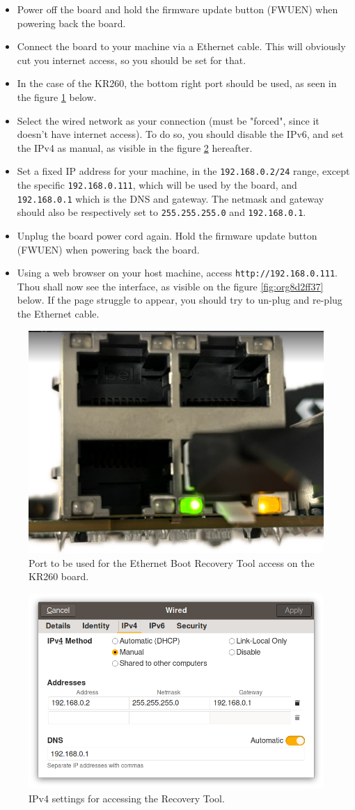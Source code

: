 \documentclass[10pt]{article}
\begin{document}
\begin{itemize}
\item Power off the board and hold the firmware update button (FWUEN) when powering back the board.
\item Connect the board to your machine via a Ethernet cable.
This will obviously cut you internet access, so you should be set for that.
\item In the case of the KR260, the bottom right port should be used, as seen in the
figure \ref{fig:orgdcccc4f} below.
\item Select the wired network as your connection (must be "forced", since it
doesn't have internet access). To do so, you should disable the IPv6, and set
the IPv4 as manual, as visible in the figure \ref{fig:orgfd4683c} hereafter.
\item Set a fixed IP address for your machine, in the \texttt{192.168.0.2/24}
range, except the specific \texttt{192.168.0.111}, which will be used by the
board, and \texttt{192.168.0.1} which is the DNS and gateway.
The netmask and gateway should also be respectively set to
\texttt{255.255.255.0} and \texttt{192.168.0.1}.
\item Unplug the board power cord again. Hold the firmware update button (FWUEN)
when powering back the board.
\item Using a web browser on your host machine, access \texttt{http://192.168.0.111}. Thou
shall now see the interface, as visible on the figure \ref{fig:org8d2ff37} below. If
the page struggle to appear, you should try to un-plug and re-plug the
Ethernet cable.
\end{itemize}

\begin{figure}[htbp]
\centering
\includegraphics[width=.4\textwidth]{img/krport.png}
\caption{\label{fig:orgdcccc4f}Port to be used for the Ethernet Boot Recovery Tool access on the KR260 board.}
\end{figure}

\begin{figure}[htbp]
\centering
\includegraphics[width=.6\textwidth]{img/ipv4set.png}
\caption{\label{fig:orgfd4683c}IPv4 settings for accessing the Recovery Tool.}
\end{figure}
\end{document}
